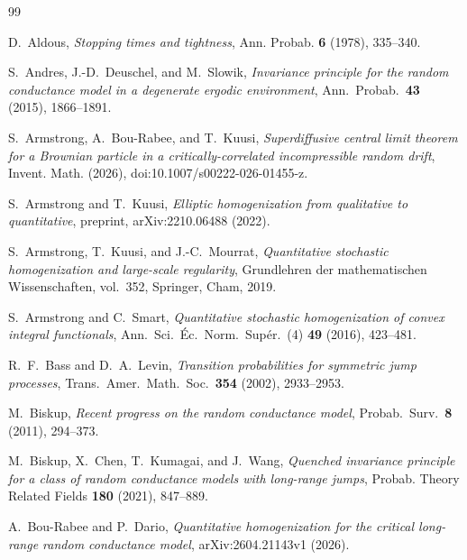 \documentclass[11pt]{amsart}
\numberwithin{equation}{section}
\begin{document}
\begin{thebibliography}{99}

D.~Aldous,
\emph{Stopping times and tightness},
Ann. Probab. \textbf{6} (1978), 335--340.

S.~Andres, J.-D.~Deuschel, and M.~Slowik,
\emph{Invariance principle for the random conductance model in a degenerate ergodic environment},
Ann.\ Probab.\ \textbf{43} (2015), 1866--1891.

S.~Armstrong, A.~Bou-Rabee, and T.~Kuusi,
\emph{Superdiffusive central limit theorem for a Brownian particle in a critically-correlated incompressible random drift},
Invent. Math. (2026), doi:10.1007/s00222-026-01455-z.

S.~Armstrong and T.~Kuusi,
\emph{Elliptic homogenization from qualitative to quantitative},
preprint, arXiv:2210.06488 (2022).

S.~Armstrong, T.~Kuusi, and J.-C.~Mourrat,
\emph{Quantitative stochastic homogenization and large-scale regularity},
Grundlehren der mathematischen Wissenschaften, vol.~352, Springer, Cham, 2019.

S.~Armstrong and C.~Smart,
\emph{Quantitative stochastic homogenization of convex integral functionals},
Ann.\ Sci.\ \'Ec.\ Norm.\ Sup\'er.\ (4) \textbf{49} (2016), 423--481.

R.~F.~Bass and D.~A.~Levin,
\emph{Transition probabilities for symmetric jump processes},
Trans.\ Amer.\ Math.\ Soc.\ \textbf{354} (2002), 2933--2953.

M.~Biskup,
\emph{Recent progress on the random conductance model},
Probab.\ Surv.\ \textbf{8} (2011), 294--373.

M.~Biskup, X.~Chen, T.~Kumagai, and J.~Wang,
\emph{Quenched invariance principle for a class of random conductance models with long-range jumps},
Probab. Theory Related Fields \textbf{180} (2021), 847--889.

A.~Bou-Rabee and P.~Dario,
\emph{Quantitative homogenization for the critical long-range random conductance model},
arXiv:2604.21143v1 (2026).


\end{thebibliography}
\end{document}
